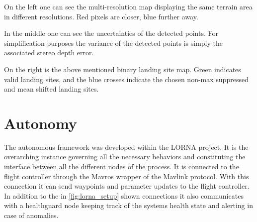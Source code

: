 On the left one can see the multi-resolution map displaying the same terrain area in different resolutions. Red pixels are closer, blue further away.

In the middle one can see the uncertainties of the detected points. For simplification purposes the variance of the detected points is simply the associated stereo depth error.

On the right is the above mentioned binary landing site map. Green indicates valid landing sites, and the blue crosses indicate the chosen non-max suppressed and mean shifted landing sites.

\section{Autonomy}\label{sec:setup:autonomy}

The autonomous framework was developed within the LORNA project. It is the overarching instance governing all the necessary behaviors and constituting the interface between all the different nodes of the process. It is connected to the flight controller through the Mavros wrapper of the Mavlink protocol. With this connection it can send waypoints and parameter updates to the flight controller.
In addition to the in \cref{fig:lorna_setup} shown connections it also communicates with a healthguard node keeping track of the systems health state and alerting in case of anomalies.








